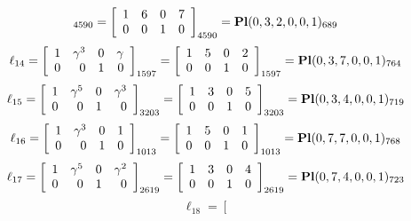 \documentclass{article}
\begin{document}
{$$_{4590}
=
\left[
\begin{array}{*{4}c}
1  & 6  & 0  & 7\\
0  & 0  & 1  & 0\\
\end{array}
\right]_{4590}
={\rm\bf Pl}(0,3,2,0,0,1 )_{689}$$
$$
\ell_{14} = 
\left[
\begin{array}{*{4}{r}}
1 & \gamma^{3} & 0 & \gamma \\
0 & 0 & 1 & 0\\
\end{array}
\right]
_{1597}
=
\left[
\begin{array}{*{4}c}
1  & 5  & 0  & 2\\
0  & 0  & 1  & 0\\
\end{array}
\right]_{1597}
={\rm\bf Pl}(0,3,7,0,0,1 )_{764}$$
$$
\ell_{15} = 
\left[
\begin{array}{*{4}{r}}
1 & \gamma^{5} & 0 & \gamma^{3}\\
0 & 0 & 1 & 0\\
\end{array}
\right]
_{3203}
=
\left[
\begin{array}{*{4}c}
1  & 3  & 0  & 5\\
0  & 0  & 1  & 0\\
\end{array}
\right]_{3203}
={\rm\bf Pl}(0,3,4,0,0,1 )_{719}$$
$$
\ell_{16} = 
\left[
\begin{array}{*{4}{r}}
1 & \gamma^{3} & 0 & 1\\
0 & 0 & 1 & 0\\
\end{array}
\right]
_{1013}
=
\left[
\begin{array}{*{4}c}
1  & 5  & 0  & 1\\
0  & 0  & 1  & 0\\
\end{array}
\right]_{1013}
={\rm\bf Pl}(0,7,7,0,0,1 )_{768}$$
$$
\ell_{17} = 
\left[
\begin{array}{*{4}{r}}
1 & \gamma^{5} & 0 & \gamma^{2}\\
0 & 0 & 1 & 0\\
\end{array}
\right]
_{2619}
=
\left[
\begin{array}{*{4}c}
1  & 3  & 0  & 4\\
0  & 0  & 1  & 0\\
\end{array}
\right]_{2619}
={\rm\bf Pl}(0,7,4,0,0,1 )_{723}$$
$$
\ell_{18} = 
\left[
$$}
\end{document}
